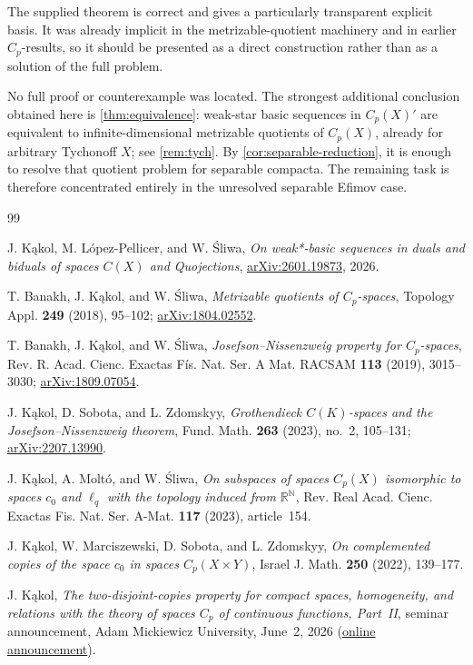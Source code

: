\documentclass[11pt]{article}
\newcommand{\Cp}{C_p}
\begin{document}
The supplied theorem is correct and gives a particularly transparent explicit
basis.  It was already implicit in the metrizable-quotient machinery and in
earlier $\Cp$-results, so it should be presented as a direct construction rather
than as a solution of the full problem.

No full proof or counterexample was located.  The strongest additional
conclusion obtained here is \cref{thm:equivalence}: weak-star basic sequences
in $\Cp(X)'$ are equivalent to infinite-dimensional metrizable quotients of
$\Cp(X)$, already for arbitrary Tychonoff $X$; see \cref{rem:tych}.  By \cref{cor:separable-reduction}, it is enough to
resolve that quotient problem for separable compacta.  The remaining task is
therefore concentrated entirely in the unresolved separable Efimov case.

\begin{thebibliography}{99}

J. K\k{a}kol, M. L\'opez-Pellicer, and W. \'Sliwa,
\emph{On weak*-basic sequences in duals and biduals of spaces $C(X)$ and
Quojections}, \href{https://arxiv.org/abs/2601.19873}{arXiv:2601.19873}, 2026.

T. Banakh, J. K\k{a}kol, and W. \'Sliwa,
\emph{Metrizable quotients of $C_p$-spaces},
Topology Appl. \textbf{249} (2018), 95--102;
\href{https://arxiv.org/abs/1804.02552}{arXiv:1804.02552}.

T. Banakh, J. K\k{a}kol, and W. \'Sliwa,
\emph{Josefson--Nissenzweig property for $C_p$-spaces},
Rev. R. Acad. Cienc. Exactas F\'is. Nat. Ser. A Mat. RACSAM
\textbf{113} (2019), 3015--3030;
\href{https://arxiv.org/abs/1809.07054}{arXiv:1809.07054}.

J. K\k{a}kol, D. Sobota, and L. Zdomskyy,
\emph{Grothendieck $C(K)$-spaces and the Josefson--Nissenzweig theorem},
Fund. Math. \textbf{263} (2023), no.~2, 105--131;
\href{https://arxiv.org/abs/2207.13990}{arXiv:2207.13990}.

J. K\k{a}kol, A. Molt\'o, and W. \'Sliwa,
\emph{On subspaces of spaces $C_p(X)$ isomorphic to spaces $c_0$ and
$\ell_q$ with the topology induced from $\mathbb{R}^{\mathbb{N}}$},
Rev. Real Acad. Cienc. Exactas Fis. Nat. Ser. A-Mat.
\textbf{117} (2023), article~154.

J. K\k{a}kol, W. Marciszewski, D. Sobota, and L. Zdomskyy,
\emph{On complemented copies of the space $c_0$ in spaces $C_p(X\times Y)$},
Israel J. Math. \textbf{250} (2022), 139--177.

J. K\k{a}kol,
\emph{The two-disjoint-copies property for compact spaces, homogeneity, and
relations with the theory of spaces $C_p$ of continuous functions, Part~II},
seminar announcement, Adam Mickiewicz University, June~2, 2026
(\href{https://wmi.amu.edu.pl/zycie-naukowe/wyklady-i-seminaria/seminarium-zakladow-analizy-funkcjonalnej-oraz-analizy-matematycznej/wlasnosc-dwoch-rozlacznych-kopii-dla-przestrzeni-zwartych\%2C-jednorodnosc-i-relacje-z-teoria-przestrzeni-c_p-funkcji-ciaglych-czesc-ii}{online announcement}).

\end{thebibliography}
\end{document}
